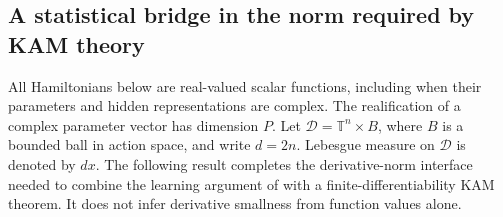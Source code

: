 
\subsection{A statistical bridge in the norm required by KAM theory}
\label{sec:statistical-bridge}

All Hamiltonians below are real-valued scalar functions, including when their
parameters and hidden representations are complex. The realification of a complex
parameter vector has dimension $P$. Let $\mathcal D=\mathbb T^n\times B$,
where $B$ is a bounded ball in action space, and write $d=2n$.
Lebesgue measure on $\mathcal D$ is denoted by $dx$.
The following result completes the derivative-norm interface needed to combine
the learning argument of \citet{chen2022} with a finite-differentiability KAM
theorem. It does not infer derivative smallness from function values alone.

